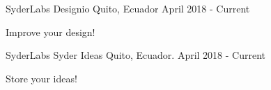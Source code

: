 
\begin{cventries}

  \cventry
    {SyderLabs}
    {Designio}
    {Quito, Ecuador}
    {April 2018 - Current}
    {
      \begin{cvitems}
        \item {Improve your design!}                         
      \end{cvitems} 
    }
    
  \cventry
    {SyderLabs}
    {Syder Ideas}
    {Quito, Ecuador.}
    {April 2018 - Current}
    {
      \begin{cvitems}
        \item {Store your ideas!}
      \end{cvitems}
    }
        
\end{cventries}
